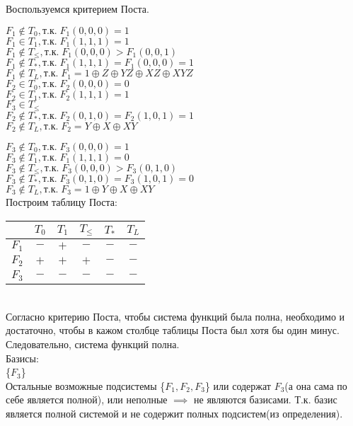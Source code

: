 \documentclass[a4paper,12pt]{report} %
\begin{document}
\begin{flushleft}
	Воспользуемся критерием Поста.
	\begin{multicols}{2}
		$F_1\notin{T_0}, \text{т.к.}\; F_1(0,0,0)=1 $ \\
		$F_1 \in{T_1},\text{т.к.}\; F_1(1,1,1)=1 $ \\
		$F_1 \notin{T_\leq}, \text{т.к.}\; F_1(0,0,0)>F_1(0,0,1) $ \\
		$F_1 \notin{T_*}, \text{т.к.}\; F_1(1,1,1)=F_1(0,0,0) = 1 $ \\
		$F_1 \notin{T_L}, \text{т.к.}\; F_1=1 \oplus Z \oplus YZ \oplus XZ \oplus XYZ$ \\
		\bigskip
		$F_2 \in{T_0}, \text{т.к.}\; F_2(0,0,0)=0 $ \\
		$F_2 \in{T_1},\text{т.к.}\; F_2(1,1,1)=1 $ \\
		$F_3 \in{T_\leq}$ \\
		$F_2 \notin{T_*}, \text{т.к.}\; F_2(0,1,0)=F_2(1,0,1) = 1 $ \\
		$F_2 \notin{T_L}, \text{т.к.}\; F_2=Y \oplus X \oplus XY $ \\
	\end{multicols}
	\bigskip
	$F_3 \notin{T_0}, \text{т.к.}\; F_3(0,0,0)=1 $ \\
	$F_3 \notin{T_1},\text{т.к.}\; F_1(1,1,1)=0 $ \\
	$F_3 \notin{T_\leq}, \text{т.к.}\; F_3(0,0,0)>F_3(0,1,0) $ \\
	$F_3 \notin{T_*}, \text{т.к.}\; F_3(0,1,0)=F_3(1,0,1) = 0 $ \\
	$F_3 \notin{T_L}, \text{т.к.}\; F_3=1 \oplus Y \oplus X \oplus XY$ \\
	
	Построим таблицу Поста:\\
	\bigskip
	\begin{tabular}{| c | c | c | c | c | c |}
		\hline
		       & $T_0$ & $T_1$ & $T_\leq$ & $T_*$ & $T_L$ \\
		\hline
		$F_1 $ & $-$   & $+$   & $-$      & $-$   & $-$   \\
		\hline
		$F_2$  & $+$   & $+$   & $+$      & $-$   & $-$   \\
		\hline
		$F_3$  & $-$   & $-$   & $-$      & $-$   & $-$   \\
		\hline
	\end{tabular}\\
	\bigskip
	Согласно критерию Поста, чтобы система функций была полна, необходимо и достаточно, чтобы в кажом столбце таблицы Поста был хотя бы один минус.\\
	Следовательно, система функций полна.\\
	
	Базисы:\\
	\{$F_3$\}\\
	Остальные возможные подсистемы \{$F_1, F_2, F_3$\} или содержат $F_3$(а она сама по себе является полной), или неполные $\implies$ не являются базисами. Т.к. базис является полной системой и не содержит полных подсистем(из определения).
\end{flushleft}
\end{document}
